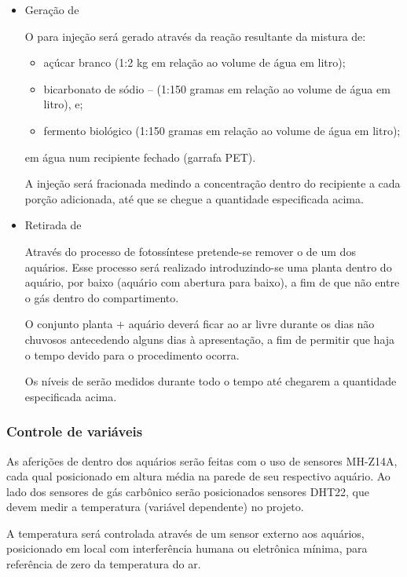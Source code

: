 \documentclass[article,11pt,oneside,a4paper,
	english,	%
	brazil,		%
	sumario=tradicional]{abntex2}
\begin{document}
\begin{itemize}
	\item Geração de 

	      O  para injeção será gerado através da reação resultante da mistura de:
	      \begin{itemize}
		      \item açúcar branco (1:2 \si{\kilo\gram} em relação ao volume de água em litro);
		      \item bicarbonato de sódio --  (1:150 gramas em relação ao volume de água em litro), e;
		      \item fermento biológico (1:150 gramas em relação ao volume de água em litro);
	      \end{itemize}
	      em água num recipiente fechado (garrafa PET).

	      A injeção será fracionada medindo a concentração dentro do recipiente a cada porção adicionada, até que se chegue a quantidade especificada acima.

	\item Retirada de 

	      Através do processo de fotossíntese pretende-se remover o  de um dos aquários. Esse processo será realizado introduzindo-se uma planta dentro do aquário, por baixo (aquário com abertura para baixo), a fim de que não entre o gás dentro do compartimento.

	      O conjunto planta $ + $ aquário deverá ficar ao ar livre durante os dias não chuvosos antecedendo alguns dias à apresentação, a fim de permitir que haja o tempo devido para o procedimento ocorra.

	      Os níveis de  serão medidos durante todo o tempo até chegarem a quantidade especificada acima.
\end{itemize}

\subsubsection{Controle de variáveis}

As aferições de  dentro dos aquários serão feitas com o uso de sensores MH-Z14A, cada qual posicionado em altura média na parede de seu respectivo aquário. Ao lado dos sensores de gás carbônico serão posicionados sensores DHT22, que devem medir a temperatura (variável dependente) no projeto.

A temperatura será controlada através de um sensor externo aos aquários, posicionado em local com interferência humana ou eletrônica mínima, para referência de zero da temperatura do ar.
\end{document}
